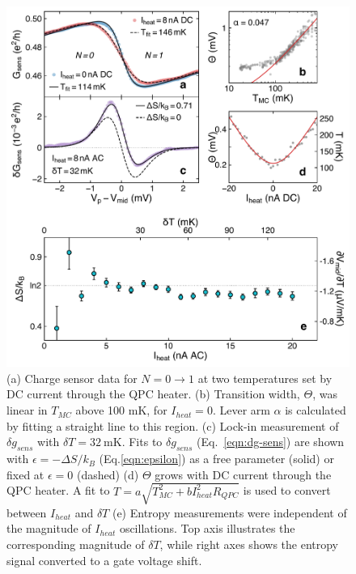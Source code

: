 \documentclass[twocolumn,showpacs,amsmath,amssymb,prl,aps,superscriptaddress]{revtex4-1}
\begin{document}
\begin{figure}[!]
        \includegraphics[width=1.0\columnwidth]{../figures/figure_2.pdf}
        \caption{\label{fig:fig2}(a) Charge sensor data for $N=0 \rightarrow 1$ at two temperatures set by DC current through the QPC heater. (b) Transition width, $\Theta$, was linear in $T_{MC}$ above 100 mK, for $I_{heat}=0$. Lever arm $\alpha$ is calculated by fitting a straight line to this region.  (c) Lock-in measurement of $\delta g_{sens}$ with $\delta T = \SI{32}{\milli\kelvin}$. Fits to $\delta g_{sens}$ (Eq.~\ref{eqn:dg-sens}) are shown with $\epsilon=-\Delta S / k_B$  (Eq.\ref{eqn:epsilon}) as a free parameter (solid) or fixed at $\epsilon=0$ (dashed)  (d) $\Theta$ grows with DC current through the QPC heater. A fit to $T = a\sqrt{T^{2}_{MC}+b I^2_{heat}R_{QPC}}$ is used to convert between $I_{heat}$ and $\delta T$ \cite{Mittal1996} (e)  Entropy measurements were independent of the magnitude of $I_{heat}$ oscillations. Top axis illustrates the corresponding magnitude of $\delta T$, while right axes shows the entropy signal converted to a gate voltage shift.}
\end{figure}
\end{document}
